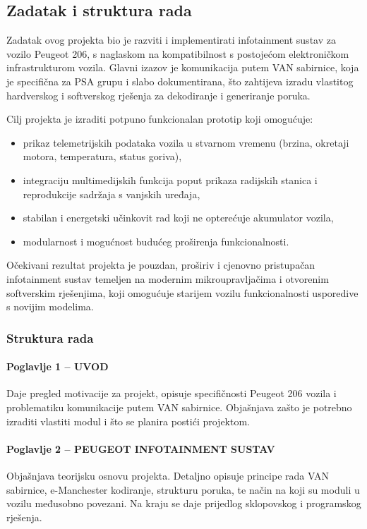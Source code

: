 \subsection{Zadatak i struktura rada}

Zadatak ovog projekta bio je razviti i implementirati infotainment sustav za vozilo Peugeot 206, s naglaskom na kompatibilnost s postojećom elektroničkom infrastrukturom vozila. Glavni izazov je komunikacija putem VAN sabirnice, koja je specifična za PSA grupu i slabo dokumentirana, što zahtijeva izradu vlastitog hardverskog i softverskog rješenja za dekodiranje i generiranje poruka.

Cilj projekta je izraditi potpuno funkcionalan prototip koji omogućuje:
\begin{itemize}
  \item prikaz telemetrijskih podataka vozila u stvarnom vremenu (brzina, okretaji motora, temperatura, status goriva),

  \item integraciju multimedijskih funkcija poput prikaza radijskih stanica i reprodukcije sadržaja s vanjskih uređaja,

  \item stabilan i energetski učinkovit rad koji ne opterećuje akumulator vozila,

  \item modularnost i mogućnost budućeg proširenja funkcionalnosti.
\end{itemize}

Očekivani rezultat projekta je pouzdan, proširiv i cjenovno pristupačan infotainment sustav temeljen na modernim mikroupravljačima i otvorenim softverskim rješenjima, koji omogućuje starijem vozilu funkcionalnosti usporedive s novijim modelima.

\subsubsection{Struktura rada}
\paragraph{Poglavlje 1 – UVOD}
Daje pregled motivacije za projekt, opisuje specifičnosti Peugeot 206 vozila i problematiku komunikacije putem VAN sabirnice. Objašnjava zašto je potrebno izraditi vlastiti modul i što se planira postići projektom.

\paragraph{Poglavlje 2 – PEUGEOT INFOTAINMENT SUSTAV}
Objašnjava teorijsku osnovu projekta. Detaljno opisuje principe rada VAN sabirnice, e-Manchester kodiranje, strukturu poruka, te način na koji su moduli u vozilu međusobno povezani. Na kraju se daje prijedlog sklopovskog i programskog rješenja.

